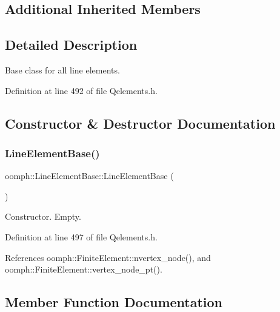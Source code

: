 \subsection*{Additional Inherited Members}


\subsection{Detailed Description}
Base class for all line elements. 

Definition at line 492 of file Qelements.\+h.



\subsection{Constructor \& Destructor Documentation}
\mbox{\label{classoomph_1_1LineElementBase_a39c0e003c2b1569e7f33fdfbc47c79e4}} 
\subsubsection{\texorpdfstring{Line\+Element\+Base()}{LineElementBase()}}
{\footnotesize\ttfamily oomph\+::\+Line\+Element\+Base\+::\+Line\+Element\+Base (\begin{DoxyParamCaption}{ }\end{DoxyParamCaption})\hspace{0.3cm}{\ttfamily [inline]}}



Constructor. Empty. 



Definition at line 497 of file Qelements.\+h.



References oomph\+::\+Finite\+Element\+::nvertex\+\_\+node(), and oomph\+::\+Finite\+Element\+::vertex\+\_\+node\+\_\+pt().



\subsection{Member Function Documentation}
\mbox{\label{classoomph_1_1LineElementBase_ad80307523c850d58bca7b925df15e46d}} 
